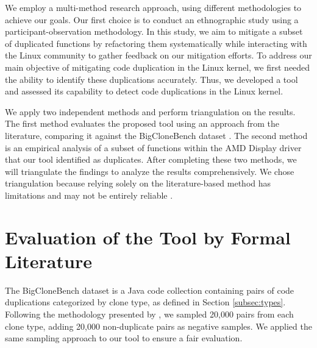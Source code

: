 
We employ a multi-method research approach, using different methodologies to achieve our goals. Our first choice is to conduct an ethnographic study using a participant-observation methodology. In this study, we aim to mitigate a subset of duplicated functions by refactoring them systematically while interacting with the Linux community to gather feedback on our mitigation efforts. To address our main objective of mitigating code duplication in the Linux kernel, we first needed the ability to identify these duplications accurately. Thus, we developed a tool and assessed its capability to detect code duplications in the Linux kernel.

We apply two independent methods and perform triangulation on the results. The first method evaluates the proposed tool using an approach from the literature, comparing it against the BigCloneBench dataset \citep{bigclonebench}. The second method is an empirical analysis of a subset of functions within the AMD Display driver that our tool identified as duplicates. After completing these two methods, we will triangulate the findings to analyze the results comprehensively. We chose triangulation because relying solely on the literature-based method has limitations and may not be entirely reliable \citep{bigfail, litreview}.

\section{Evaluation of the Tool by Formal Literature}

\label{sec:metbig}

The BigCloneBench dataset \citep{bigclonebench} is a Java code collection containing pairs of code duplications categorized by clone type, as defined in Section \ref{subsec:types}.
%
Following the methodology presented by \citep{tailor}, we sampled 20,000 pairs from each clone type, adding 20,000 non-duplicate pairs as negative samples. We applied the same sampling approach to our tool to ensure a fair evaluation.

